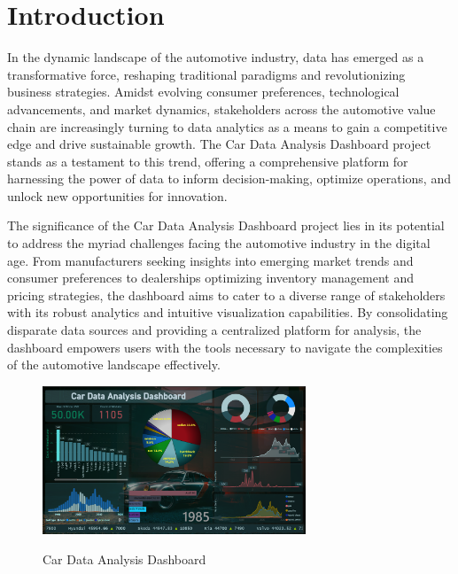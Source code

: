 \documentclass{article}
\begin{document}
\sectionfont{\huge\centering}
\subsectionfont{\Large}
\subsubsectionfont{\large}
\newpage
\section{Introduction}
\vspace{1cm}
{\fontsize{15}{15}\selectfont
In the dynamic landscape of the automotive industry, data has emerged as a transformative force, reshaping traditional paradigms and revolutionizing business strategies. Amidst evolving consumer preferences, technological advancements, and market dynamics, stakeholders across the automotive value chain are increasingly turning to data analytics as a means to gain a competitive edge and drive sustainable growth. The Car Data Analysis Dashboard project stands as a testament to this trend, offering a comprehensive platform for harnessing the power of data to inform decision-making, optimize operations, and unlock new opportunities for innovation.

The significance of the Car Data Analysis Dashboard project lies in its potential to address the myriad challenges facing the automotive industry in the digital age. From manufacturers seeking insights into emerging market trends and consumer preferences to dealerships optimizing inventory management and pricing strategies, the dashboard aims to cater to a diverse range of stakeholders with its robust analytics and intuitive visualization capabilities. By consolidating disparate data sources and providing a centralized platform for analysis, the dashboard empowers users with the tools necessary to navigate the complexities of the automotive landscape effectively.

\begin{figure}[htbp]
  \centering
  \vspace{0.3cm}
  \includegraphics[width=0.7\textwidth]{Figures/dashboard1.png}\\
  \caption{Car Data Analysis Dashboard}
  \vspace{0.3cm}
\end{figure}

}
\end{document}
